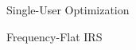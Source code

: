 \documentclass{IEEEtran}
\begin{document}
\begin{section}{Single-User Optimization}
\begin{subsection}{Frequency-Flat IRS}
	\end{subsection}



\end{section}
\end{document}
